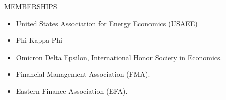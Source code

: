 \documentclass[9pt]{article}
\begin{document}
\vspace{10pt}
MEMBERSHIPS
\begin{itemize}[noitemsep, nolistsep]
\item United States Association for Energy Economics (USAEE)
\item Phi Kappa Phi
\item Omicron Delta Epsilon, International Honor Society in Economics.
\item Financial Management Association (FMA).
\item Eastern Finance Association (EFA).
\end{itemize}
\vspace{15pt}
\end{document}
